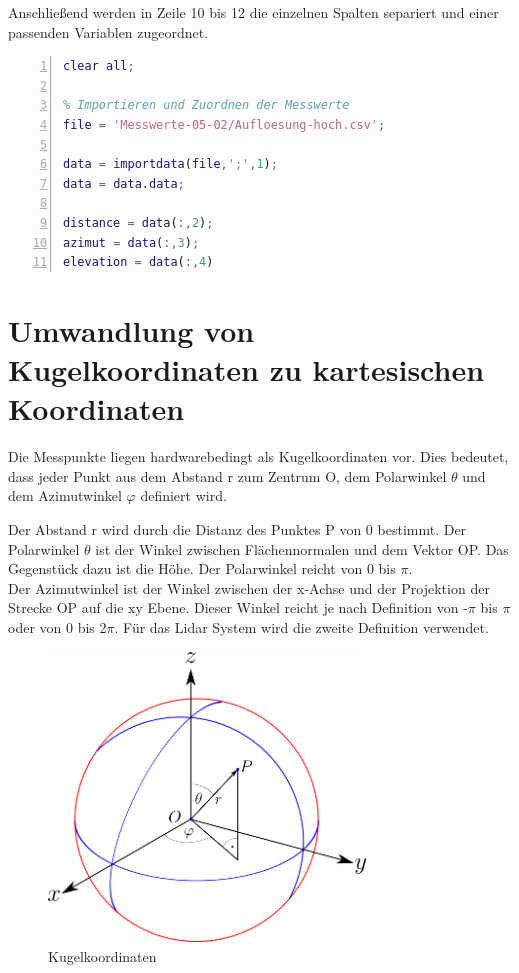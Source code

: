 Anschließend werden in Zeile 10 bis 12 die einzelnen Spalten separiert und einer passenden Variablen zugeordnet. 

\begin{lstlisting}[caption={Importieren und Zuordnen von .csv Dateien},language={Matlab}, label={import_data}, numbers=left]
% Anwendung zur Darstellung einer 3D Punktewolke aus einem LIDAR System
clear all;

% Importieren und Zuordnen der Messwerte
file = 'Messwerte-05-02/Aufloesung-hoch.csv';

data = importdata(file,';',1); 
data = data.data;

distance = data(:,2);
azimut = data(:,3);
elevation = data(:,4)
\end{lstlisting}


\section{Umwandlung von Kugelkoordinaten zu kartesischen Koordinaten}

Die Messpunkte liegen hardwarebedingt als Kugelkoordinaten vor. Dies bedeutet, dass jeder Punkt aus dem Abstand r zum Zentrum O, dem Polarwinkel $\theta$ und dem Azimutwinkel $\varphi$ definiert wird.

Der Abstand r wird durch die Distanz des Punktes P von 0 bestimmt. Der Polarwinkel $\theta$ ist der Winkel zwischen Flächennormalen und dem Vektor OP. Das Gegenstück dazu ist die Höhe.  Der Polarwinkel reicht von 0 bis $\pi$. \\
Der Azimutwinkel ist der Winkel zwischen der x-Achse und der Projektion der Strecke OP auf die xy Ebene. Dieser Winkel reicht je nach Definition von  -$\pi$ bis $\pi$ oder von 0 bis 2$\pi$. Für das Lidar System wird die zweite Definition verwendet.

\begin{figure}[H]
	\centering
	\includegraphics[width=0.75\textwidth]{images/Auswertung/Kugelkoordinaten}
	\caption{Kugelkoordinaten}
	\label{kugelkoordinaten}
\end{figure}



